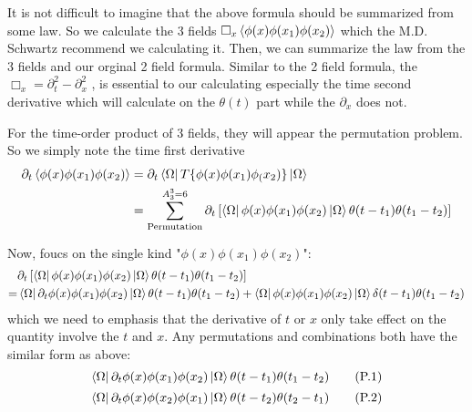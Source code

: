 \documentclass[12pt,openany]{book}
\begin{document}
    It is not difficult to imagine that the above formula should be summarized from some law. So we calculate the 3 fields $\Box_x\braket{\phi(x)\phi(x_1)\phi(x_2)}$ which the M.D. Schwartz 
    recommend we calculating it. Then, we can summarize the law from the 3 fields and our orginal 2 field formula. Similar to the 2 field formula, the $\Box_x=\partial_t^2-\partial_x^2$ , is 
    essential to our calculating especially the time second derivative which will calculate on the $\theta(t)$ part while the $\partial_x$ does not.
    \par 
    For the time-order product of 3 fields, they will appear the permutation problem. So we simply note the time first derivative
    \begin{equation}
    	\begin{aligned}
    		\partial_t\braket{\phi(x)\phi(x_1)\phi(x_2)}&=\partial_t\bra{\Omega}T\{\phi(x)\phi(x_1)\phi_(x_2)\}\ket{\Omega}\\
    		                                            &=\sum_{\text{Permutation}}^{A_{3}^{3}=6}\partial_t\left[\bra{\Omega}\phi(x)\phi(x_1)\phi(x_2)\ket{\Omega}\theta(t-t_1)\theta(t_1-t_2)\right]
    	\end{aligned}
    \end{equation}
    \par 
    Now, foucs on the single kind "$\phi(x)\phi(x_1)\phi(x_2)$":
    \begin{equation}
    \begin{aligned}
    		&\partial_t\left[\bra{\Omega}\phi(x)\phi(x_1)\phi(x_2)\ket{\Omega}\theta(t-t_1)\theta(t_1-t_2)\right]\\
    	=&\bra{\Omega}\partial_t\phi(x)\phi(x_1)\phi(x_2)\ket{\Omega}\theta(t-t_1)\theta(t_1-t_2)+\bra{\Omega}\phi(x)\phi(x_1)\phi(x_2)\ket{\Omega}\delta(t-t_1)\theta(t_1-t_2)        
    	
    \end{aligned}
    \end{equation}
    which we need to emphasis that the derivative of $t$ or $x$ only take effect on the quantity involve the $t$ and $x$. Any permutations and combinations both have the similar form as above:
	\begin{equation}
		\bra{\Omega}\partial_t\phi(x)\phi(x_1)\phi(x_2)\ket{\Omega}\theta(t-t_1)\theta(t_1-t_2) \tag{P.1}
	\end{equation}
	\begin{equation}
		\bra{\Omega}\partial_t\phi(x)\phi(x_2)\phi(x_1)\ket{\Omega}\theta(t-t_2)\theta(t_2-t_1) \tag{P.2}
	\end{equation}
\end{document}
